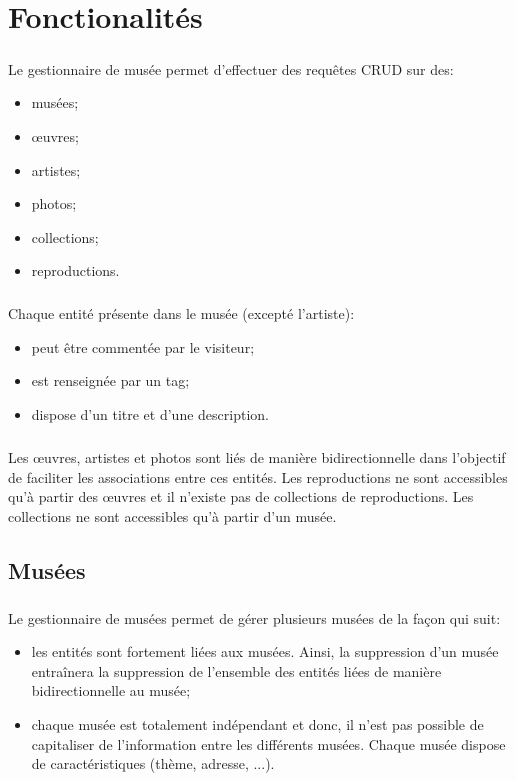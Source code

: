 \chapter{Fonctionalités}
\paragraph{}
Le gestionnaire de musée permet d'effectuer des requêtes CRUD sur des:
\begin{itemize}
\item musées;
\item \oe{}uvres;
\item artistes;
\item photos;
\item collections;
\item reproductions.
\end{itemize}

\paragraph{}
Chaque entité présente dans le musée (excepté l'artiste):
\begin{itemize}
\item peut être commentée par le visiteur;
\item est renseignée par un tag;
\item dispose d'un titre et d'une description.
\end{itemize}

\paragraph{}
Les \oe{}uvres, artistes et photos sont liés de manière bidirectionnelle dans l'objectif de faciliter les associations entre ces entités.
Les reproductions ne sont accessibles qu'à partir des \oe{}uvres et il n'existe pas de collections de reproductions. Les collections ne sont accessibles qu'à partir d'un musée.

\section{Musées}
\paragraph{}
Le gestionnaire de musées permet de gérer plusieurs musées de la façon qui suit:
\begin{itemize}
\item les entités sont fortement liées aux musées. Ainsi, la suppression d'un musée entraînera la suppression de l'ensemble des entités liées de manière bidirectionnelle au musée;
\item chaque musée est totalement indépendant et donc, il n'est pas possible de capitaliser de l'information entre les différents musées.
Chaque musée dispose de caractéristiques (thème, adresse, ...).
\end{itemize}

